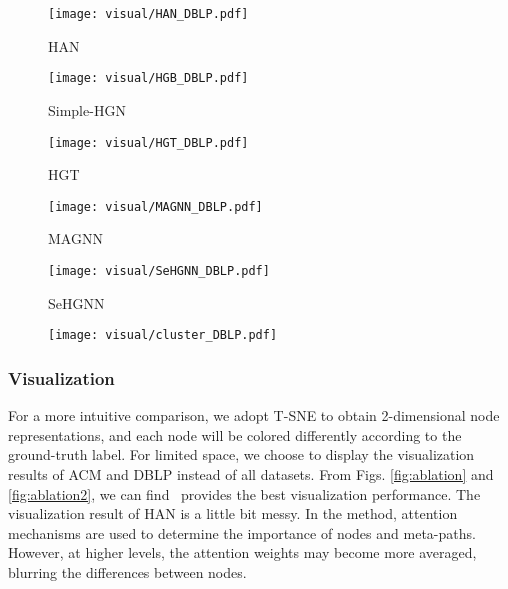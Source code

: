 \begin{figure*}[!t]
    \centering
    \begin{flushleft}
	\begin{subfigure}[t]{0.16\linewidth}
		\texttt{[image: visual/HAN\_DBLP.pdf]}
		\caption{HAN}
	\end{subfigure}
         \begin{subfigure}[t]{0.16\linewidth}
		\texttt{[image: visual/HGB\_DBLP.pdf]}
		\caption{Simple-HGN}
	\end{subfigure}
	\begin{subfigure}[t]{0.16\linewidth}
		\texttt{[image: visual/HGT\_DBLP.pdf]}
		\caption{HGT}
	\end{subfigure}
        \begin{subfigure}[t]{0.16\linewidth}
		\texttt{[image: visual/MAGNN\_DBLP.pdf]}
		\caption{MAGNN}
	\end{subfigure}
        \begin{subfigure}[t]{0.16\linewidth}
		\texttt{[image: visual/SeHGNN\_DBLP.pdf]}
		\caption{SeHGNN}
	\end{subfigure}
        \begin{subfigure}[t]{0.16\linewidth}
		\texttt{[image: visual/cluster\_DBLP.pdf]}
		\caption{\alg}
	\end{subfigure}
	\caption{Visualization of embedding on DBLP. Nodes with different labels are differentiated by colors.}
	\label{fig:ablation2}
    \end{flushleft}
\end{figure*}

\subsubsection{Visualization} 
For a more intuitive comparison, we adopt T-SNE \cite{liao2018attributed} to obtain 2-dimensional node representations, and each node will be colored differently according to the ground-truth label.
%
For limited space, we choose to display the visualization results of ACM and DBLP instead of all datasets.
%
From Figs. \ref{fig:ablation} and \ref{fig:ablation2}, we can find \alg~provides the best visualization performance. 
The visualization result of HAN is a little bit messy. 
%
In the method, attention mechanisms are used to determine the importance of nodes and meta-paths. 
%
However, at higher levels, the attention weights may become more averaged, blurring the differences between nodes. 

